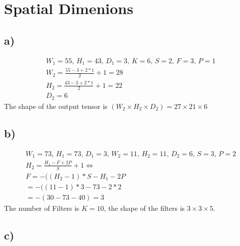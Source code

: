 \documentclass[]{article}
\begin{document}
\section{Spatial Dimenions}
\subsection*{a)}
\begin{align*}
W_1 = 55,\, H_1 = 43,\, D_1 = 3,\, K = 6,\, S = 2,\, F  = 3,\, P = 1 \\
W_2 = \frac{55 - 3 + 2*1}{2} + 1 = 28 \\
H_2 = \frac{43 - 3 + 2*1}{2} + 1 = 22 \\
D_2 = 6
\end{align*}
The shape of the output tensor is $(W_2 \times H_2 \times D_2) = 27 \times 21 \times 6$

\subsection*{b)}
\begin{align*}
W_1 = 73,\, H_1 = 73,\, D_1 =3 ,\, W_2 = 11,\, H_2 = 11,\, D_2 = 6,\, S = 3,\,P = 2\\
H_2 = \frac{H_1 - F + 2P}{S} + 1 \Leftrightarrow \\
F = -((H_2 - 1) * S - H_1 - 2P \\
= -((11 - 1) * 3 - 73 - 2*2 \\
= -(30 - 73 - 40) = 3
\end{align*}
The number of Filters is $K = 10$, the shape of the filters is $3 \times 3 \times 5$.

\subsection*{c)}
\end{document}
